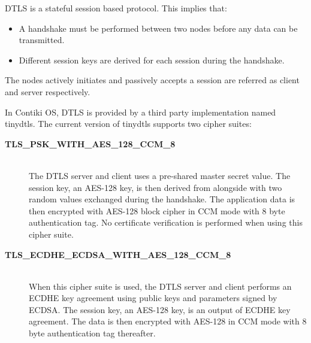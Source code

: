 DTLS is a stateful session based protocol. This implies that:
\begin{itemize}
\item A handshake must be performed between two nodes before any data can be transmitted.
\item Different session keys are derived for each session during the handshake.
\end{itemize}

The nodes actively initiates and passively accepts a session are referred as client and server respectively.

In Contiki OS, DTLS is provided by a third party implementation named tinydtls\cite{tinydtls}. The current version of tinydtls supports two cipher suites:

\begin{description}
\item[\textbf{TLS\_PSK\_WITH\_AES\_128\_CCM\_8}] \hfill \\
The DTLS server and client uses a pre-shared master secret value. The session key, an AES-128 key, is then derived from alongside with two random values exchanged during the handshake. The application data is then encrypted with AES-128 block cipher in CCM mode with 8 byte authentication tag. No certificate verification is performed when using this cipher suite.
\item[\textbf{TLS\_ECDHE\_ECDSA\_WITH\_AES\_128\_CCM\_8}] \hfill \\
When this cipher suite is used, the DTLS server and client performs an ECDHE key agreement using public keys and parameters signed by ECDSA. The session key, an AES-128 key, is an output of ECDHE key agreement. The data is then encrypted with AES-128 in CCM mode with 8 byte authentication tag thereafter.
\end{description}

